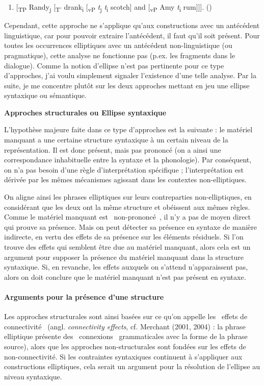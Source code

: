 \begin{enumerate}
\item \label{bkm:Ref305708886}[\textsubscript{TP} Randy\textsubscript{j} [\textsubscript{T'} drank\textsubscript{i} [\textsubscript{vP} \textit{t}\textsubscript{j}\textit{ t}\textsubscript{i} scotch] and [\textsubscript{vP} Amy \textit{t}\textsubscript{i} rum]]].      (\citet{Johnson2009})  


\end{enumerate}
Cependant, cette approche ne s'applique qu'aux constructions avec un antécédent linguistique, car pour pouvoir extraire l'antécédent, il faut qu'il soit présent. Pour toutes les occurrences elliptiques avec un antécédent non-linguistique (ou pragmatique), cette analyse ne fonctionne pas (p.ex. les fragments dans le dialogue). Comme la notion d'ellipse n'est pas pertinente pour ce type d'approches, j'ai voulu simplement signaler l'existence d'une telle analyse. Par la suite, je me concentre plutôt sur les deux approches mettant en jeu une ellipse syntaxique ou sémantique. 

{\bfseries
Approches structurales ou Ellipse syntaxique}

L'hypothèse majeure faite dans ce type d'approches est la suivante : le matériel manquant a une certaine structure syntaxique à un certain niveau de la représentation. Il est donc présent, mais pas prononcé (on a ainsi une correspondance inhabituelle entre la syntaxe et la phonologie). Par conséquent, on n'a pas besoin d'une règle d'interprétation spécifique ; l'interprétation est dérivée par les mêmes mécanismes agissant dans les contextes non-elliptiques. 

On aligne ainsi les phrases elliptiques sur leurs contreparties non-elliptiques, en considérant que les deux ont la même structure et obéissent aux mêmes règles. Comme le matériel manquant est {\guillemotleft}~non-prononcé~{\guillemotright}, il n'y a pas de moyen direct qui prouve sa présence. Mais on peut détecter sa présence en syntaxe de manière indirecte, en vertu des effets de sa présence sur les éléments résiduels. Si l'on trouve des effets qui semblent être due au matériel manquant, alors cela est un argument pour supposer la présence du matériel manquant dans la structure syntaxique. Si, en revanche, les effets auxquels on s'attend n'apparaissent pas, alors on doit conclure que le matériel manquant n'est pas présent en syntaxe.

\paragraph[Arguments pour la présence d'une structure]{Arguments pour la présence d'une structure}
Les approches structurales sont ainsi basées sur ce qu'on appelle les {\guillemotleft}~effets de connectivité~{\guillemotright} (angl. \textit{connectivity effects}, cf. Merchant (2001, 2004) : la phrase elliptique présente des {\guillemotleft}~connexions~{\guillemotright} grammaticales avec la forme de la phrase source), alors que les approches non-structurales sont fondées sur les effets de non-connectivité. Si les contraintes syntaxiques continuent à s'appliquer aux constructions elliptiques, cela serait un argument pour la résolution de l'ellipse au niveau syntaxique.

